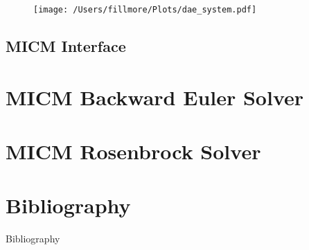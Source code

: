 \documentclass{beamer}
\begin{document}
\begin{frame}


\end{frame}

\begin{frame}
\begin{figure}
\texttt{[image: /Users/fillmore/Plots/dae\_system.pdf]}
\end{figure}
\end{frame}

\subsection{MICM Interface}

\section{MICM Backward Euler Solver}

\section{MICM Rosenbrock Solver}

\nocite{SanduI}
\nocite{SanduII}
\nocite{ODEsI}
\nocite{ODEsII}

\section{Bibliography}
\begin{frame}[allowframebreaks]{Bibliography}


\end{frame}
\end{document}
